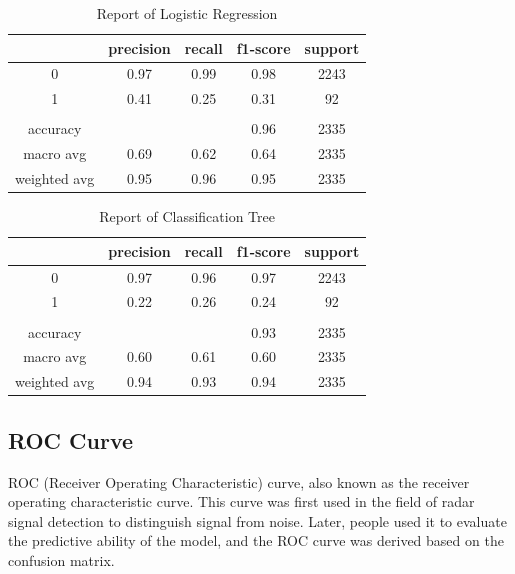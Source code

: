 \documentclass[11pt]{report}
\begin{document}
\begin{table}[h]
     \caption[table]{Report of Logistic Regression}
     \vspace{0.5em}\centering
     \begin{tabular}{ccccc}
         \toprule[1.5pt]
         &    precision    &recall  &f1-score   &support\\
         \midrule[1pt]                                   
         0       &0.97      &0.99      &0.98      &2243\\
         1       &0.41      &0.25      &0.31      &92\\
           & & & &                                   \\
  accuracy      &           &          &0.96      &2335\\
 macro avg      & 0.69      &0.62      &0.64      &2335\\
weighted avg    &   0.95    &  0.96    &  0.95    &  2335\\
         \bottomrule[1.5pt]
     \end{tabular}
\end{table}


\begin{table}[h]
     \caption[table]{Report of Classification Tree}
     \vspace{0.5em}\centering
     \begin{tabular}{ccccc}
         \toprule[1.5pt]
                &precision    &recall  &f1-score   &support\\
         \midrule[1pt]
         0      & 0.97      &0.96      &0.97      &2243\\
         1      & 0.22      &0.26      &0.24      &  92\\
         & & & &\\
  accuracy      &           &          &0.93      &2335\\
 macro avg      & 0.60      &0.61      &0.60      &2335\\
 weighted avg    &   0.94    & 0.93     & 0.94     & 2335\\
         \bottomrule[1.5pt]
     \end{tabular}
\end{table}

\subsection{ROC Curve}
ROC (Receiver Operating Characteristic) curve, also known as the receiver operating characteristic curve. This curve was first used in the field of radar signal detection to distinguish signal from noise. Later, people used it to evaluate the predictive ability of the model, and the ROC curve was derived based on the confusion matrix.
\end{document}
